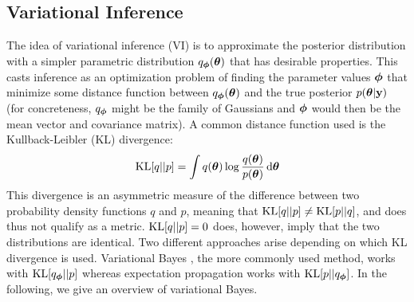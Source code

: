 \documentclass[../thesis.tex]{subfiles}
\begin{document}
\subsection{Variational Inference}
The idea of variational inference (VI) is to approximate the posterior distribution with a simpler parametric distribution $q_{\boldsymbol{\mathbf{\phi}}}(\boldsymbol{\mathbf{\theta}})$ that has desirable properties. This casts inference as an optimization problem of finding the parameter values $\boldsymbol{\mathbf{\phi}}$ that minimize some distance function between $q_{\boldsymbol{\mathbf{\phi}}}(\boldsymbol{\mathbf{\theta}})$ and the true posterior $p(\boldsymbol{\mathbf{\theta}}|\boldsymbol{\mathbf{y}})$ (for concreteness, $q_{\boldsymbol{\mathbf{\phi}}}$ might be the family of Gaussians and $\boldsymbol{\mathbf{\phi}}$ would then be the mean vector and covariance matrix). A common distance function used is the Kullback-Leibler (KL) divergence:
\begin{equation}
    \begin{split}
        \operatorname{KL}[q||p] = \int q(\boldsymbol{\mathbf{\theta}}) \log \frac{q(\boldsymbol{\mathbf{\theta}})}{p(\boldsymbol{\mathbf{\theta}})} \mathop{}\!\mathrm{d} \boldsymbol{\mathbf{\theta}}
    \end{split}
\end{equation}
This divergence is an asymmetric measure of the difference between two probability density functions $q$ and $p$, meaning that $\operatorname{KL}[q||p]\neq \operatorname{KL}[p||q]$, and does thus not qualify as a metric. $\operatorname{KL}[q||p]=0$ does, however, imply that the two distributions are identical. Two different approaches arise depending on which KL divergence is used. Variational Bayes \parencite{attias1999inferring}, the more commonly used method, works with $\operatorname{KL}[q_{\boldsymbol{\mathbf{\phi}}}||p]$ whereas expectation propagation \parencite{minka2001expectation} works with $\operatorname{KL}[p||q_{\boldsymbol{\mathbf{\phi}}}]$. 
In the following, we give an overview of variational Bayes.
\end{document}
